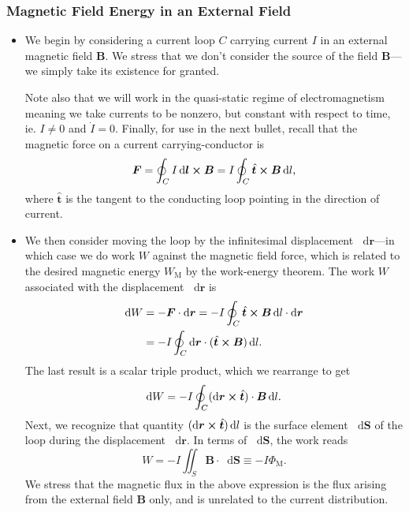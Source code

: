 \documentclass[11pt, a4paper]{article}
\newcommand{\diff}{\mathop{}\!\mathrm{d}} %
\renewcommand{\vec}[1]{\bm{#1}} %
\newcommand{\uvec}[1]{\hat{\vec{#1}}} %
\renewcommand{\r}{\vec{r}}
\newcommand{\B}{\vec{B}} %
\begin{document}
\subsubsection{Magnetic Field Energy in an External Field}
\begin{itemize}
	\item We begin by considering a current loop $ C $ carrying current $ I $ in an external magnetic field $ \B $. We stress that we don't consider the source of the field $ \B $---we simply take its existence for granted. 
	
    Note also that we will work in the quasi-static regime of electromagnetism meaning we take currents to be nonzero, but constant with respect to time, ie. $ I \neq 0 $ and $ \dot{I} = 0 $. Finally, for use in the next bullet, recall that the magnetic force on a current carrying-conductor is
	\begin{equation*}
		\vec{F} = \oint_{C} I \diff \vec{l} \cross \B = I \oint_{C} \uvec{t} \cross \B \diff l,
	\end{equation*}
	where $ \uvec{t} $ is the tangent to the conducting loop pointing in the direction of current.
	
	\item We then consider moving the loop by the infinitesimal displacement $ \diff \r $---in which case we do work $ W $ against the magnetic field force, which is related to the desired magnetic energy $ W_{\text{M}} $ by the work-energy theorem. The work $ W $ associated with the displacement $ \diff \r $ is
	\begin{align*}
		\diff W &= - \vec{F} \cdot \diff \r =  -I \oint_{C} \uvec{t} \cross \B \diff l \cdot \diff \r\\
		& = - I \oint_{C}\diff \r \cdot (\uvec{t} \cross \B) \diff l.
	\end{align*}
    The last result is a scalar triple product, which we rearrange to get
	\begin{equation*}
		\diff W = - I \oint_{C} (\diff \r \cross \uvec{t})\cdot \B \diff l.
	\end{equation*}
	Next, we recognize that quantity $ (\diff \r \cross \uvec{t}) \diff l $ is the surface element $ \diff \vec{S} $  of the loop during the displacement $ \diff \r $. In terms of $ \diff \vec{S} $, the work reads
	\begin{equation*}
		W = - I \iint_{S} \B \cdot \diff \vec{S} \equiv - I \Phi_{\mathrm{M}}.
	\end{equation*}
    We stress that the magnetic flux in the above expression is the flux arising from the external field $ \B $ only, and is unrelated to the current distribution.
	

\end{itemize}
\end{document}
